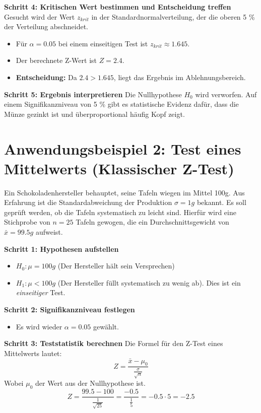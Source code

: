 \textbf{Schritt 4: Kritischen Wert bestimmen und Entscheidung treffen}
Gesucht wird der Wert $z_{krit}$ in der Standardnormalverteilung, der die oberen 5 \% der Verteilung abschneidet.
\begin{itemize}
    \item Für $\alpha = 0.05$ bei einem einseitigen Test ist $z_{krit} \approx 1.645$.
    \item Der berechnete Z-Wert ist $Z = 2.4$.
    \item \textbf{Entscheidung:} Da $2.4 > 1.645$, liegt das Ergebnis im Ablehnungsbereich.
\end{itemize}

\textbf{Schritt 5: Ergebnis interpretieren}
Die Nullhypothese $H_0$ wird verworfen. Auf einem Signifikanzniveau von 5 \% gibt es statistische Evidenz dafür, dass die Münze gezinkt ist und überproportional häufig Kopf zeigt.

\section{Anwendungsbeispiel 2: Test eines Mittelwerts (Klassischer Z-Test)}

Ein Schokoladenhersteller behauptet, seine Tafeln wiegen im Mittel 100g. Aus Erfahrung ist die Standardabweichung der Produktion $\sigma = 1g$ bekannt. Es soll geprüft werden, ob die Tafeln systematisch zu leicht sind. Hierfür wird eine Stichprobe von $n=25$ Tafeln gewogen, die ein Durchschnittsgewicht von $\bar{x} = 99.5g$ aufweist.

\textbf{Schritt 1: Hypothesen aufstellen}
\begin{itemize}
    \item $H_0: \mu = 100g$ (Der Hersteller hält sein Versprechen)
    \item $H_1: \mu < 100g$ (Der Hersteller füllt systematisch zu wenig ab). Dies ist ein \textit{einseitiger} Test.
\end{itemize}

\textbf{Schritt 2: Signifikanzniveau festlegen}
\begin{itemize}
    \item Es wird wieder $\alpha = 0.05$ gewählt.
\end{itemize}

\textbf{Schritt 3: Teststatistik berechnen}
Die Formel für den Z-Test eines Mittelwerts lautet:
$$Z = \frac{\bar{x} - \mu_0}{\frac{\sigma}{\sqrt{n}}}$$Wobei $\mu_0$ der Wert aus der Nullhypothese ist.$$Z = \frac{99.5 - 100}{\frac{1}{\sqrt{25}}} = \frac{-0.5}{\frac{1}{5}} = -0.5 \cdot 5 = -2.5$$


